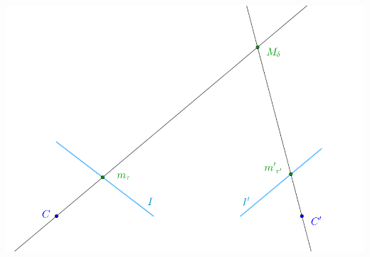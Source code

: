 \begin{minipage}{\linewidth}
	\centering
	\includegraphics[width=0.8\linewidth]{images/optimaleTriangulierung.png}
	\label{fig:TriangulationOptimal}
\end{minipage}\\ \\

%
% 
%
%
%
%

